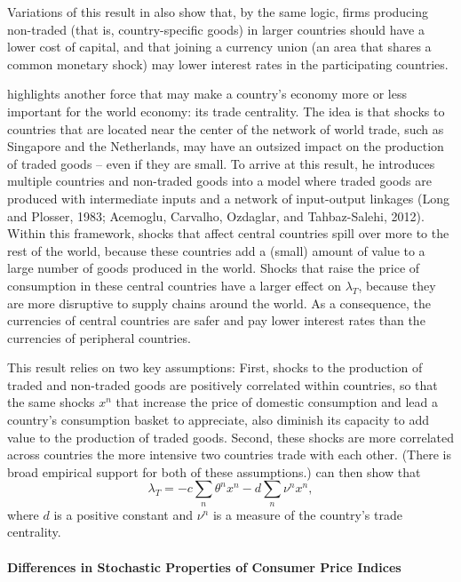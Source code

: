 \documentclass{ar-1col}
\begin{document}
 Variations of this result in \citet{Hassan2013} also show that, by the same logic, firms producing non-traded (that is, country-specific goods) in larger countries should have a lower cost of capital, and that joining a currency union (an area that shares a common monetary shock) may lower interest rates in the participating countries. 

 \citet{Richmond2019} highlights another force that may make a country's economy more or less important for the world economy: its trade centrality. The idea is that shocks to countries that are located near the center of the network of world trade, such as Singapore and the Netherlands, may have an outsized impact on the production of traded goods -- even if they are small. To arrive at this result, he introduces multiple countries and non-traded goods into a model where traded goods are produced with intermediate inputs and a network of input-output linkages (Long and Plosser, 1983; Acemoglu, Carvalho, Ozdaglar, and Tahbaz-Salehi, 2012). Within this framework, shocks that affect central countries spill over more to the rest of the world, because these countries add a (small) amount of value to a large number of goods produced in the world. Shocks that raise the price of consumption in these central countries have a larger effect on  $\lambda_T$, because they are more disruptive to supply chains around the world. As a consequence, the currencies of central countries are safer and pay lower interest rates than the currencies of peripheral countries.   

This result relies on two key assumptions: First, shocks to the production of traded and non-traded goods are positively correlated within countries, so that the same shocks $x^n$ that increase the price of domestic consumption and lead a country's consumption basket to appreciate, also diminish its capacity to add value to the production of traded goods. Second, these shocks are more correlated across countries the more intensive two countries trade with each other. (There is broad empirical support for both of these assumptions.)  \citet{Richmond2019} can then show that $$\lambda_{T} = -c
\sum_{n} \theta^n x^n- d\sum_{n} \nu^n x^n,$$ where $d$ is a positive constant and $\nu^n$ is a measure of the country's trade centrality. 

\paragraph*{Differences in Stochastic Properties of Consumer Price Indices}
\end{document}
